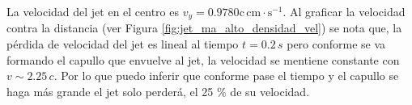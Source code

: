 \documentclass[12pt,a4paper]{book}
\begin{document}
La velocidad del jet en el centro es $v_y = 0.9780 \mathrm{c} \, \mathrm{cm}\cdot \mathrm{s}^{-1}$. Al graficar la velocidad contra la distancia (ver Figura \ref{fig:jet_ma_alto_densidad_vel}) se nota que, la pérdida de velocidad del jet es lineal al tiempo $t = 0.2 \, s$ pero conforme se va formando el capullo que envuelve al jet, la velocidad se mentiene constante con $v \sim 2.25 \,c $. Por lo que puedo inferir que conforme pase el tiempo y el capullo se haga más grande el jet solo perderá, el 25 \% de su velocidad.

\begin{figure}
\centering
{}

\end{figure}
\end{document}
